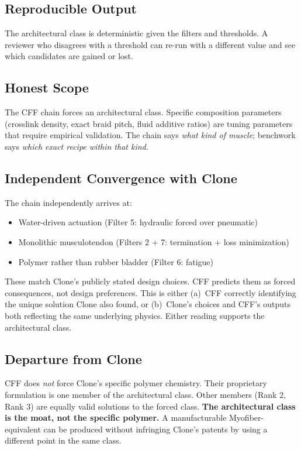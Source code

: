 \documentclass[11pt, a4paper]{article}
\begin{document}
\subsection{Reproducible Output}

The architectural class is deterministic given the filters and
thresholds. A reviewer who disagrees with a threshold can re-run
with a different value and see which candidates are gained or lost.

\subsection{Honest Scope}

The CFF chain forces an architectural class. Specific composition
parameters (crosslink density, exact braid pitch, fluid additive
ratios) are tuning parameters that require empirical validation.
The chain says \textit{what kind of muscle}; benchwork says
\textit{which exact recipe within that kind}.

\subsection{Independent Convergence with Clone}

The chain independently arrives at:

\begin{itemize}[nosep]
  \item Water-driven actuation (Filter 5: hydraulic forced over
        pneumatic)
  \item Monolithic musculotendon (Filters 2 + 7: termination
        + loss minimization)
  \item Polymer rather than rubber bladder (Filter 6: fatigue)
\end{itemize}

These match Clone's publicly stated design choices. CFF predicts
them as forced consequences, not design preferences. This is
either (a)~CFF correctly identifying the unique solution Clone
also found, or (b)~Clone's choices and CFF's outputs both
reflecting the same underlying physics. Either reading supports
the architectural class.

\subsection{Departure from Clone}

CFF does \textit{not} force Clone's specific polymer chemistry.
Their proprietary formulation is one member of the architectural
class. Other members (Rank 2, Rank 3) are equally valid solutions
to the forced class. \textbf{The architectural class is the moat,
not the specific polymer.} A manufacturable Myofiber-equivalent
can be produced without infringing Clone's patents by using a
different point in the same class.
\end{document}
